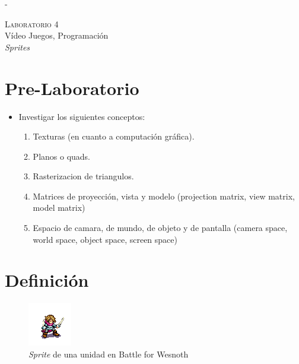 -\begin{center}
\textsc{\Large Laboratorio 4}~\\
{\large Vídeo Juegos, Programación}~\\
\emph{Sprites}
\end{center}

\section{Pre-Laboratorio}
\begin{itemize}
\item Investigar los siguientes conceptos:
\begin{enumerate}
  \item Texturas (en cuanto a computación gráfica).
  \item Planos o quads.
  \item Rasterizacion de triangulos.
  \item Matrices de proyección, vista y modelo (projection matrix, view matrix, model matrix)
  \item Espacio de camara, de mundo, de objeto y de pantalla (camera space, world space, object space, screen space)
\end{enumerate}
\end{itemize}
\section{Definición}
\setlength\intextsep{0pt}
\begin{figure}
\includegraphics[width=\linewidth]{media/sprite_ej1.png} 
\caption{\emph{Sprite} de una unidad en Battle for Wesnoth \cite{wesnothgame}}
\end{figure}

